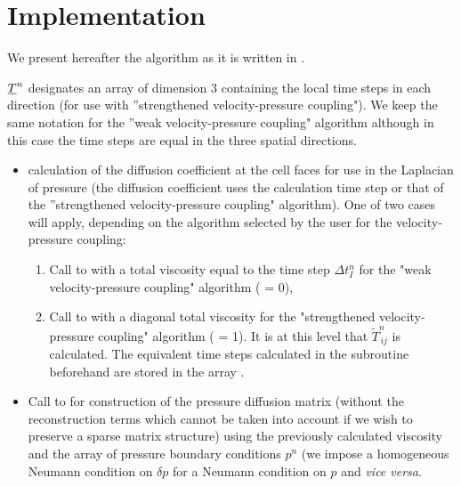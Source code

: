 \section*{Implementation}
We present hereafter the algorithm as it is written in .

$\underline{T}^n$ designates an array of dimension $3$ containing the local time steps in each direction (for use with ''strengthened velocity-pressure coupling"). We keep the same notation for the ''weak velocity-pressure coupling" algorithm although in this case the time steps are equal in the three spatial directions.

\begin{itemize}
\item calculation of the diffusion coefficient at the cell faces for use in the Laplacian of pressure (the diffusion coefficient uses the calculation time step or that of the ''strengthened velocity-pressure coupling" algorithm). One of two cases will apply, depending on the algorithm selected by the user for the velocity-pressure coupling:

\begin{enumerate}
\item Call to  with a total viscosity equal to the time step $\Delta t_I^n$ for the "weak velocity-pressure coupling" algorithm ( = 0),
\item Call to  with a diagonal total viscosity for the "strengthened velocity-pressure coupling" algorithm ( = 1). It is at this level that $\widetilde{T}^n_{\,ij}$ is calculated. The equivalent time steps calculated in the subroutine  beforehand are stored in the array .
\end{enumerate}

\item Call to  for construction of the pressure diffusion matrix (without the reconstruction terms which cannot be taken into account if we wish to preserve a sparse matrix structure) using the previously calculated viscosity and the array  of pressure boundary conditions $p^n$ (we impose a homogeneous Neumann condition on $\delta p$ for a Neumann condition on $p$ and \textit{vice versa}.

\end{itemize}

